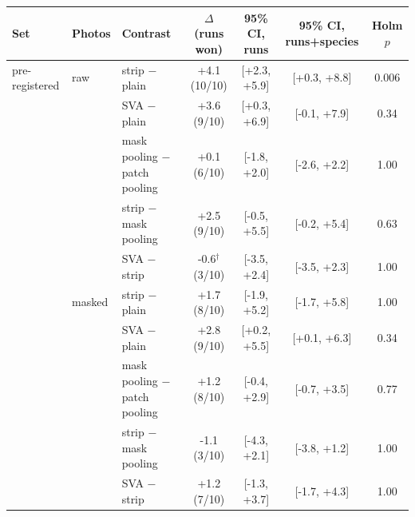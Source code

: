 \begin{tabular}{lllcccc}
\toprule
Set & Photos & Contrast & $\Delta$ (runs won) & 95\% CI, runs & 95\% CI, runs+species & Holm $p$ \\
\midrule
pre-registered & raw & strip $-$ plain & +4.1 (10/10) & [+2.3, +5.9] & [+0.3, +8.8] & 0.006 \\
 &  & SVA $-$ plain & +3.6 (9/10) & [+0.3, +6.9] & [-0.1, +7.9] & 0.34 \\
 &  & mask pooling $-$ patch pooling & +0.1 (6/10) & [-1.8, +2.0] & [-2.6, +2.2] & 1.00 \\
 &  & strip $-$ mask pooling & +2.5 (9/10) & [-0.5, +5.5] & [-0.2, +5.4] & 0.63 \\
 &  & SVA $-$ strip & -0.6$^\dagger$ (3/10) & [-3.5, +2.4] & [-3.5, +2.3] & 1.00 \\
\midrule
 & masked & strip $-$ plain & +1.7 (8/10) & [-1.9, +5.2] & [-1.7, +5.8] & 1.00 \\
 &  & SVA $-$ plain & +2.8 (9/10) & [+0.2, +5.5] & [+0.1, +6.3] & 0.34 \\
 &  & mask pooling $-$ patch pooling & +1.2 (8/10) & [-0.4, +2.9] & [-0.7, +3.5] & 0.77 \\
 &  & strip $-$ mask pooling & -1.1 (3/10) & [-4.3, +2.1] & [-3.8, +1.2] & 1.00 \\
 &  & SVA $-$ strip & +1.2 (7/10) & [-1.3, +3.7] & [-1.7, +4.3] & 1.00 \\
\bottomrule
\end{tabular}